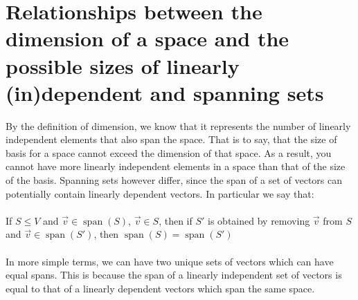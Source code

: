 \documentclass{report}
\begin{document}
\section{Relationships between the dimension of a space and the possible sizes of linearly (in)dependent and spanning sets}
\noindent By the definition of dimension, we know that it represents the number of linearly independent elements that also span the space. That is to say, that the size of basis for a space cannot exceed the dimension of that space. As a result, you cannot have more linearly independent elements in a space than that of the size of the basis. Spanning sets however differ, since the span of a set of vectors can potentially contain linearly dependent vectors. In particular we say that: \\
\\
\noindent If $S\le V$ and $\vec{v}\in\operatorname{span}(S)$, $\vec{v}\in S$, then if $S'$ is obtained by removing $\vec{v}$ from $S$ and $\vec{v}\in\operatorname{span}(S')$, then $\operatorname{span}(S)=\operatorname{span}(S')$ \\
\\
\noindent In more simple terms, we can have two unique sets of vectors which can have equal spans. This is because the span of a linearly independent set of vectors is equal to that of a linearly dependent vectors which span the same space.
\end{document}
